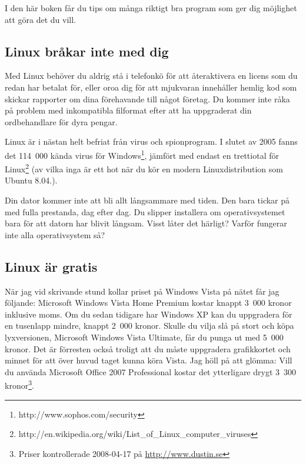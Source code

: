 \documentclass[a4paper,final]{memoir} %
\newcommand\xubuntuver{8.04}
\begin{document}
I den här boken får du tips om många riktigt bra program som ger dig möjlighet att göra det du vill.



\subsection{Linux bråkar inte med dig}

Med Linux behöver du aldrig stå i telefonkö för att återaktivera en licens som du redan har betalat för, eller oroa dig för att mjukvaran innehåller hemlig kod som skickar rapporter om dina förehavande till något företag. Du kommer inte råka på problem med inkompatibla filformat efter att ha uppgraderat din ordbehandlare för dyra pengar.

Linux är i nästan helt befriat från virus och spionprogram. I slutet av 2005 fanns det 114~000 kända virus för Windows\footnote{http://www.sophos.com/security}, jämfört med endast en trettiotal för Linux\footnote{http://en.wikipedia.org/wiki/List\_of\_Linux\_computer\_viruses} (av vilka inga är ett hot när du kör en modern Linuxdistribution som Ubuntu \xubuntuver{}.). 

Din dator kommer inte att bli allt långsammare med tiden. Den bara tickar på med fulla prestanda, dag efter dag. Du slipper installera om operativsystemet bara för att datorn har blivit långsam. Visst låter det härligt? Varför fungerar inte alla operativsystem så?


\subsection{Linux är gratis}

När jag vid skrivande stund kollar priset på Windows Vista på nätet får jag följande: Microsoft Windows Vista Home Premium kostar knappt 3~000 kronor inklusive moms. Om du sedan tidigare har Windows XP kan du uppgradera för en tusenlapp mindre, knappt 2~000 kronor. Skulle du vilja slå på stort och köpa lyxversionen, Microsoft Windows Vista Ultimate, får du punga ut med 5~000 kronor. Det är förresten också troligt att du måste uppgradera grafikkortet och minnet för att över huvud taget kunna köra Vista. Jag höll på att glömma: Vill du använda Microsoft Office 2007 Professional kostar det ytterligare drygt 3~300 kronor\footnote{Priser kontrollerade 2008-04-17 på \url{http://www.dustin.se}}.
\end{document}
